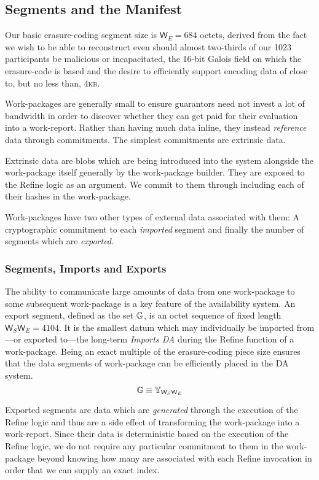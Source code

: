 \subsection{Segments and the Manifest}

Our basic erasure-coding segment size is $\mathsf{W}_E = 684$ octets, derived from the fact we wish to be able to reconstruct even should almost two-thirds of our 1023 participants be malicious or incapacitated, the 16-bit Galois field on which the erasure-code is based and the desire to efficiently support encoding data of close to, but no less than, 4\textsc{kb}.

Work-packages are generally small to ensure guarantors need not invest a lot of bandwidth in order to discover whether they can get paid for their evaluation into a work-report. Rather than having much data inline, they instead \emph{reference} data through commitments. The simplest commitments are extrinsic data.

Extrinsic data are blobs which are being introduced into the system alongside the work-package itself generally by the work-package builder. They are exposed to the Refine logic as an argument. We commit to them through including each of their hashes in the work-package.

Work-packages have two other types of external data associated with them: A cryptographic commitment to each \emph{imported} segment and finally the number of segments which are \emph{exported}.

\subsubsection{Segments, Imports and Exports}

The ability to communicate large amounts of data from one work-package to some subsequent work-package is a key feature of the \Jam availability system. An export segment, defined as the set $\mathbb{G}$, is an octet sequence of fixed length $\mathsf{W}_S\mathsf{W}_E = 4104$. It is the smallest datum which may individually be imported from---or exported to---the long-term \emph{Imports DA} during the Refine function of a work-package. Being an exact multiple of the erasure-coding piece size ensures that the data segments of work-package can be efficiently placed in the DA system.
\begin{equation}\label{eq:segment}
  \mathbb{G} \equiv \mathbb{Y}_{\mathsf{W}_S\mathsf{W}_E}
\end{equation}

Exported segments are data which are \emph{generated} through the execution of the Refine logic and thus are a side effect of transforming the work-package into a work-report. Since their data is deterministic based on the execution of the Refine logic, we do not require any particular commitment to them in the work-package beyond knowing how many are associated with each Refine invocation in order that we can supply an exact index.

